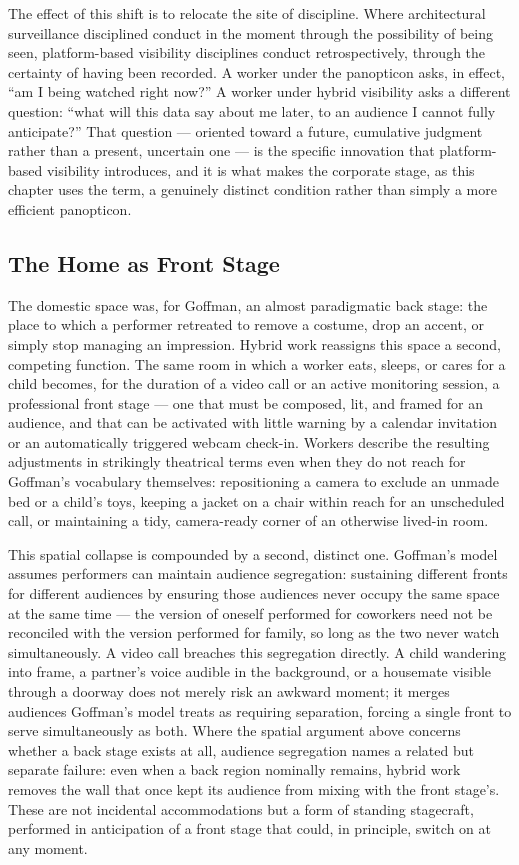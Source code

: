 \documentclass[12pt]{article}
\begin{document}
The effect of this shift is to relocate the site of discipline. Where architectural surveillance disciplined conduct in the moment through the possibility of being seen, platform-based visibility disciplines conduct retrospectively, through the certainty of having been recorded. A worker under the panopticon asks, in effect, ``am I being watched right now?'' A worker under hybrid visibility asks a different question: ``what will this data say about me later, to an audience I cannot fully anticipate?'' That question --- oriented toward a future, cumulative judgment rather than a present, uncertain one --- is the specific innovation that platform-based visibility introduces, and it is what makes the corporate stage, as this chapter uses the term, a genuinely distinct condition rather than simply a more efficient panopticon.

\subsection{The Home as Front Stage}

The domestic space was, for Goffman, an almost paradigmatic back stage: the place to which a performer retreated to remove a costume, drop an accent, or simply stop managing an impression. Hybrid work reassigns this space a second, competing function. The same room in which a worker eats, sleeps, or cares for a child becomes, for the duration of a video call or an active monitoring session, a professional front stage --- one that must be composed, lit, and framed for an audience, and that can be activated with little warning by a calendar invitation or an automatically triggered webcam check-in. Workers describe the resulting adjustments in strikingly theatrical terms even when they do not reach for Goffman's vocabulary themselves: repositioning a camera to exclude an unmade bed or a child's toys, keeping a jacket on a chair within reach for an unscheduled call, or maintaining a tidy, camera-ready corner of an otherwise lived-in room.

This spatial collapse is compounded by a second, distinct one. Goffman's model assumes performers can maintain audience segregation: sustaining different fronts for different audiences by ensuring those audiences never occupy the same space at the same time --- the version of oneself performed for coworkers need not be reconciled with the version performed for family, so long as the two never watch simultaneously. A video call breaches this segregation directly. A child wandering into frame, a partner's voice audible in the background, or a housemate visible through a doorway does not merely risk an awkward moment; it merges audiences Goffman's model treats as requiring separation, forcing a single front to serve simultaneously as both. Where the spatial argument above concerns whether a back stage exists at all, audience segregation names a related but separate failure: even when a back region nominally remains, hybrid work removes the wall that once kept its audience from mixing with the front stage's. These are not incidental accommodations but a form of standing stagecraft, performed in anticipation of a front stage that could, in principle, switch on at any moment.
\end{document}
